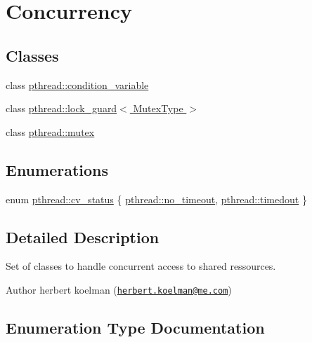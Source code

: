\hypertarget{group__concurrency}{}\section{Concurrency}
\label{group__concurrency}
\subsection*{Classes}
\begin{DoxyCompactItemize}
\item 
class \hyperlink{classpthread_1_1condition__variable}{pthread\+::condition\+\_\+variable}
\item 
class \hyperlink{classpthread_1_1lock__guard}{pthread\+::lock\+\_\+guard$<$ Mutex\+Type $>$}
\item 
class \hyperlink{classpthread_1_1mutex}{pthread\+::mutex}
\end{DoxyCompactItemize}
\subsection*{Enumerations}
\begin{DoxyCompactItemize}
\item 
enum \hyperlink{group__concurrency_ga823f88a2bf448bd5bd5273b826830bdd}{pthread\+::cv\+\_\+status} \{ \hyperlink{group__concurrency_gga823f88a2bf448bd5bd5273b826830bdda633b1bc5140f77a22f2c26bea4fa3398}{pthread\+::no\+\_\+timeout}, 
\hyperlink{group__concurrency_gga823f88a2bf448bd5bd5273b826830bdda1c2d3e88a4ad820053c817753867b31a}{pthread\+::timedout}
 \}
\end{DoxyCompactItemize}


\subsection{Detailed Description}
Set of classes to handle concurrent access to shared ressources.

\begin{DoxyAuthor}{Author}
herbert koelman (\href{mailto:herbert.koelman@me.com}{\tt herbert.\+koelman@me.\+com}) 
\end{DoxyAuthor}


\subsection{Enumeration Type Documentation}

